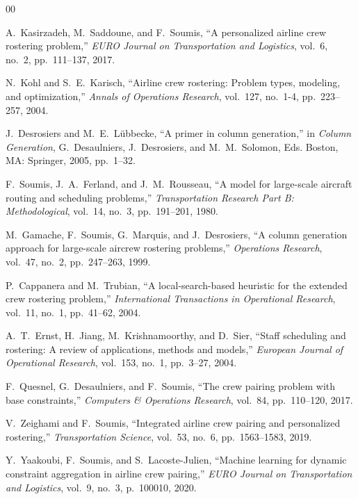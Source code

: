 \documentclass[journal]{IEEEtran}
\begin{document}
\begin{thebibliography}{00}

A.~Kasirzadeh, M.~Saddoune, and F.~Soumis, ``A personalized airline crew rostering problem,'' \emph{EURO Journal on Transportation and Logistics}, vol.~6, no.~2, pp.~111--137, 2017.

N.~Kohl and S.~E.~Karisch, ``Airline crew rostering: Problem types, modeling, and optimization,'' \emph{Annals of Operations Research}, vol.~127, no.~1-4, pp.~223--257, 2004.

J.~Desrosiers and M.~E.~L{\"u}bbecke, ``A primer in column generation,'' in \emph{Column Generation}, G.~Desaulniers, J.~Desrosiers, and M.~M.~Solomon, Eds. Boston, MA: Springer, 2005, pp.~1--32.

F.~Soumis, J.~A.~Ferland, and J.~M.~Rousseau, ``A model for large-scale aircraft routing and scheduling problems,'' \emph{Transportation Research Part B: Methodological}, vol.~14, no.~3, pp.~191--201, 1980.

M.~Gamache, F.~Soumis, G.~Marquis, and J.~Desrosiers, ``A column generation approach for large-scale aircrew rostering problems,'' \emph{Operations Research}, vol.~47, no.~2, pp.~247--263, 1999.

P.~Cappanera and M.~Trubian, ``A local-search-based heuristic for the extended crew rostering problem,'' \emph{International Transactions in Operational Research}, vol.~11, no.~1, pp.~41--62, 2004.

A.~T.~Ernst, H.~Jiang, M.~Krishnamoorthy, and D.~Sier, ``Staff scheduling and rostering: A review of applications, methods and models,'' \emph{European Journal of Operational Research}, vol.~153, no.~1, pp.~3--27, 2004.

F.~Quesnel, G.~Desaulniers, and F.~Soumis, ``The crew pairing problem with base constraints,'' \emph{Computers \& Operations Research}, vol.~84, pp.~110--120, 2017.

V.~Zeighami and F.~Soumis, ``Integrated airline crew pairing and personalized rostering,'' \emph{Transportation Science}, vol.~53, no.~6, pp.~1563--1583, 2019.

Y.~Yaakoubi, F.~Soumis, and S.~Lacoste-Julien, ``Machine learning for dynamic constraint aggregation in airline crew pairing,'' \emph{EURO Journal on Transportation and Logistics}, vol.~9, no.~3, p.~100010, 2020.


\end{thebibliography}
\end{document}
